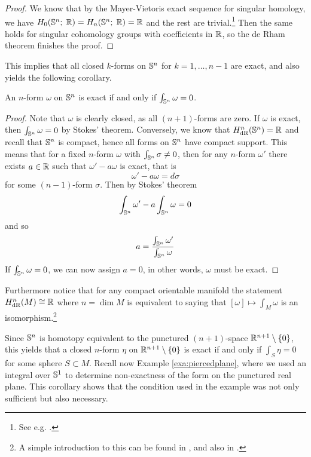 \documentclass[a4paper, 12pt]{article}
\begin{document}
\begin{proof}
    We know that by the Mayer-Vietoris exact sequence for singular homology,
    we have $H_0(\S^n;\; \R) = H_n(\S^n; \; \R) = \R$ and the rest are trivial.\footnote{See e.g. \cite[Example 2.46]{Hatcher2002}.}
    Then the same holds for singular cohomology groups with coefficients in $\R$, so the de Rham theorem finishes the proof.
\end{proof}
This implies that all closed $k$-forms on $\S^n$ for $k = 1,\dots,n-1$ are exact, and also yields the following corollary.
\begin{corollary}
    An $n$-form $\omega$ on $\S^n$ is exact if and only if $\int_{\S^n} \omega = 0$.
\end{corollary}
\begin{proof}
    Note that $\omega$ is clearly closed, as all $(n+1)$-forms are zero.
    If $\omega$ is exact, then $\int_{\S^n} \omega = 0$ by Stokes' theorem.
    Conversely, we know that $H_{\text{dR}}^n(\S^n) = \R$ and recall that $\S^n$ is compact, hence all forms on $\S^n$ have compact support.
    This means that for a fixed $n$-form $\omega$ with $\int_{\S^n} \sigma \neq 0$,
    then for any $n$-form $\omega'$ there exists $a \in \R$ such that $\omega' - a\omega$ is exact, that is
    \[
        \omega' - a\omega = d\sigma
    \]
    for some $(n-1)$-form $\sigma$.
    Then by Stokes' theorem
    \[
        \int_{\S^n} \omega' - a \int_{\S^n} \omega = 0
    \]
    and so
    \[
        a = \frac{\int_{\S^n} \omega'}{\int_{\S^n} \omega}
    \]
    If $\int_{\S^n} \omega = 0$, we can now assign $a = 0$, in other words,
    $\omega$ must be exact.
\end{proof}
\begin{remark}
    Furthermore notice that for any compact orientable manifold the statement
    $H_{\text{dR}}^n(M) \iso \R$ where $n = \dim M$ is equivalent to saying
    that $[\omega] \mapsto \int_{M}\omega$ is an isomorphism.\footnote{A simple introduction to this can be found in \cite[Volume 1, pp. 268--271]{Spivak1999Comp}, and also in \cite{Lee2012}.}
\end{remark}
Since $\S^n$ is homotopy equivalent to the punctured $(n+1)$-space
$\R^{n+1}\setminus\left\{ 0 \right\}$, this yields that a closed $n$-form
$\eta$ on $\R^{n+1}\setminus\left\{ 0 \right\}$ is exact if and only if
$\int_{S} \eta = 0$ for some sphere $S\subset M$.  Recall now Example
\ref{exa:piercedplane}, where we used an integral over $\S^1$ to determine
non-exactness of the form on the punctured real plane.  This corollary shows
that the condition used in the example was not only sufficient but also
necessary.
\end{document}
